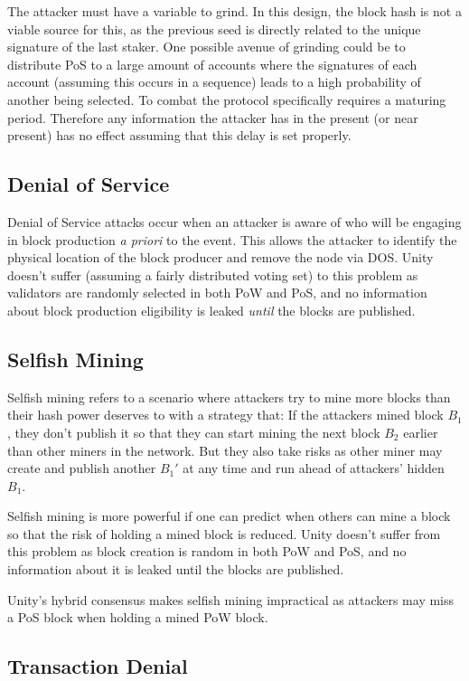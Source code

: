 \documentclass[a4paper]{article}
\begin{document}
The attacker must have a variable to grind. In this design, the block hash is not a viable source for this, as the previous seed is directly related to the unique signature of the last staker. One possible avenue of grinding could be to distribute PoS to a large amount of accounts where the signatures of each account (assuming this occurs in a sequence) leads to a high probability of another being selected. To combat the protocol specifically requires a maturing period. Therefore any information the attacker has in the present (or near present) has no effect assuming that this delay is set properly.

\subsection{Denial of Service}

Denial of Service attacks occur when an attacker is aware of who will be engaging in block production \textit{a priori} to the event. This allows the attacker to identify the physical location of the block producer and remove the node via DOS. Unity doesn't suffer (assuming a fairly distributed voting set) to this problem as validators are randomly selected in both PoW and PoS, and no information about block production eligibility is leaked \textit{until} the blocks are published.

\subsection{Selfish Mining}

Selfish mining refers to a scenario where attackers try to mine more blocks than their hash power deserves to with a strategy that: If the attackers mined block $B_1$, they don't publish it so that they can start mining the next block $B_2$ earlier than other miners in the network. But they also take risks as other miner may create and publish another $B_1'$ at any time and run ahead of attackers' hidden $B_1$.

Selfish mining is more powerful if one can predict when others can mine a block so that the risk of holding a mined block is reduced. Unity doesn't suffer from this problem as block creation is random in both PoW and PoS, and no information about it is leaked until the blocks are published.

Unity's hybrid consensus makes selfish mining impractical as attackers may miss a PoS block when holding a mined PoW block.

\subsection{Transaction Denial}
\end{document}
